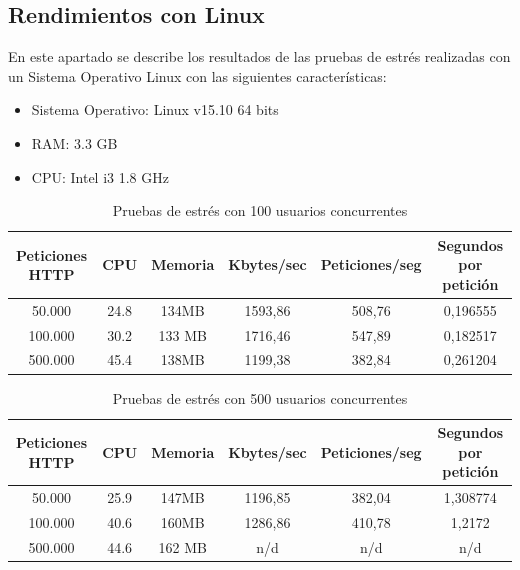 \subsection{Rendimientos con Linux}

En este apartado se describe los resultados de las pruebas de estrés realizadas con un Sistema Operativo Linux con las siguientes características:

\begin{itemize}
	\item Sistema Operativo: Linux v15.10 64 bits
	\item RAM: 3.3 GB
	\item CPU: Intel i3 1.8 GHz
\end{itemize}

\begin{table}[H]
	\begin{center}
		\begin{tabular}{|c|c|c|c|c|c|}\hline
			Peticiones HTTP & CPU & Memoria & Kbytes/sec & Peticiones/seg & Segundos por petición \\ \hline
			50.000 & 24.8 & 134MB & 1593,86 & 508,76 & 0,196555 \\ \hline
			100.000 & 30.2 & 133 MB & 1716,46 & 547,89 & 0,182517 \\ \hline
			500.000 & 45.4 & 138MB & 1199,38 & 382,84 & 0,261204 \\ \hline
		\end{tabular}
		\caption{Pruebas de estrés con 100 usuarios concurrentes}
		\label{tabla:CienteUsuarios}
	\end{center}
\end{table}

\begin{table}[H]
	\begin{center}
		\begin{tabular}{|c|c|c|c|c|c|} 	\hline
			Peticiones HTTP & CPU & Memoria & Kbytes/sec & Peticiones/seg & Segundos por petición \\ \hline
			50.000 & 25.9 & 147MB & 1196,85 & 382,04 & 1,308774 \\ \hline
			100.000 & 40.6 & 160MB & 1286,86 & 410,78 & 1,2172 \\ \hline
			500.000 & 44.6 & 162 MB & n/d & n/d & n/d \\ \hline
		\end{tabular}
		\caption{Pruebas de estrés con 500 usuarios concurrentes}
		\label{tabla:QuinientosUsuarios}
	\end{center}
\end{table}

